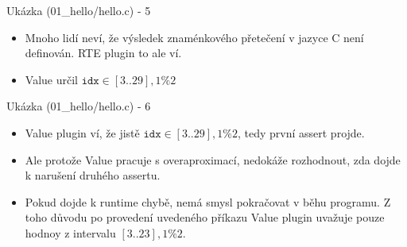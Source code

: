 \documentclass[11pt]{beamer}
\begin{document}


\begin{frame}{Ukázka (01\_hello/hello.c) - 5}
	\lstFirstValueMainPartThree
	\begin{itemize}
			\item Mnoho lidí neví, že výsledek znaménkového přetečení 
				v jazyce C není definován. RTE plugin to ale ví.
			\item Value určil \( \texttt{idx} \in [3..29],1 \%2 \)

	\end{itemize}
\end{frame}


\begin{frame}{Ukázka (01\_hello/hello.c) - 6}
	\lstFirstValueMainPartFour

	\begin{itemize}
			\item Value plugin ví, že jistě \( \texttt{idx} \in [3..29],1 \%2 \),
				tedy první assert projde.
			\item Ale protože Value pracuje s overaproximací, nedokáže rozhodnout,
				zda dojde k narušení druhého assertu.
			\item Pokud dojde k runtime chybě, nemá smysl pokračovat v běhu programu.
				Z toho důvodu po provedení uvedeného příkazu Value plugin uvažuje
				pouze hodnoy z intervalu \( [3..23],1\%2 \).
	\end{itemize}
\end{frame}

\end{document}
